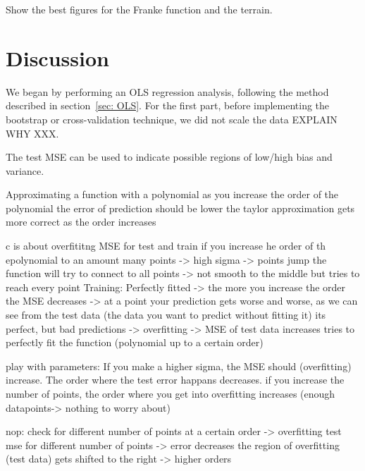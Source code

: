 \documentclass[reprint,english,notitlepage]{revtex4-1}  %
\begin{document}
Show the best figures for the Franke function and the terrain. 













\newpage
\section{Discussion}\label{sec:discussion}

We began by performing an OLS regression analysis, following the method described in section~\ref{sec: OLS}. 
For the first part, before implementing the bootstrap or cross-validation technique, we did not scale the data EXPLAIN WHY XXX. 





The test MSE can be used to indicate possible regions of low/high bias and variance. 


Approximating a function with a polynomial 
as you increase the order of the polynomial the error of prediction should be lower 
the taylor approximation gets more correct as the order increases 


c is about overfititng MSE for test and train 
if you increase he order of th epolynomial to an amount 
    many points -> high sigma -> points jump 
    the function will try to connect to all points -> not smooth to the middle but tries to reach every point 
    Training: Perfectly fitted -> the more you increase the order the MSE decreases -> at a point your prediction gets worse and worse, as we can see from the test data (the data you want to predict without fitting it) its perfect, but bad predictions -> overfitting -> MSE of test data increases 
    tries to perfectly fit the function (polynomial up to a certain order) 
    
    play with parameters: If you make a higher sigma, the MSE should (overfitting) increase. The order where the test error happans decreases. 
    if you increase the number of points, the order where you get into overfitting increases (enough datapoints-> nothing to worry about) 
    
    nop: check for different number of points at a certain order -> overfitting 
        test mse for different number of points -> error decreases 
        the region of overfitting (test data) gets shifted to the right -> higher orders 
        
\end{document}
